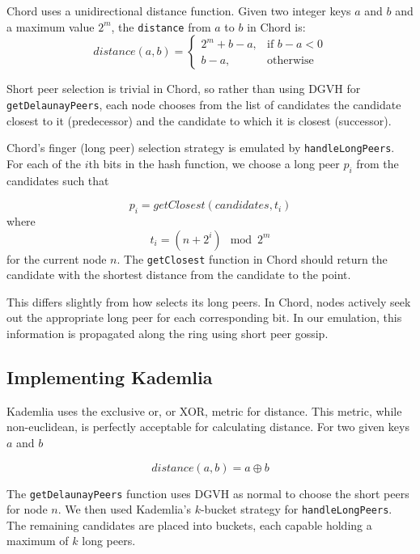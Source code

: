 \documentclass[11pt,conference]{IEEEtran}
\begin{document}
Chord uses a unidirectional distance function.
Given two integer keys $ a $ and $ b $ and a maximum value $ 2^{m}$, the \texttt{distance} from $ a $ to $ b $ in Chord is: 
\[ distance(a,b) =
\begin{cases}
	2^m + b - a, & \text{if } b - a < 0 \\
	b-a, & \text{otherwise}
\end{cases}
  \]


Short peer selection is trivial in Chord, so rather than using DGVH for \texttt{getDelaunayPeers}, each node chooses from the list of candidates the candidate closest to it (predecessor) and the candidate to which it is closest (successor).

Chord's finger (long peer) selection strategy is emulated by \texttt{handleLongPeers}.
For each of the $i$th bits in the hash function, we choose a long peer $ p_i $ from the candidates such that 


\[ p_i =   getClosest\left(candidates, t_{i}\right)  \]
where
\[t_{i} =  (n + 2^{i}) \mod 2^m \]
for the current node $n$.
The \texttt{getClosest} function in Chord should return the candidate with the shortest distance from the candidate to the point.

This differs slightly from how selects its long peers.
In Chord, nodes actively seek out the appropriate long peer for each  corresponding bit.
In our emulation, this information is propagated along the ring using short peer gossip.




\subsection{Implementing Kademlia}
Kademlia uses the exclusive or, or XOR, metric for distance.
This metric, while non-euclidean, is perfectly acceptable for calculating distance.
For two given keys $ a $ and $ b $

\[ distance(a, b) = a  \oplus b\]

The \texttt{getDelaunayPeers} function uses DGVH as normal to choose the short peers for node $n$.
We then used Kademlia's $k$-bucket strategy \cite{kademlia} for \texttt{handleLongPeers}.
The remaining candidates are placed into buckets, each capable holding a maximum of $k$ long peers.
\end{document}

